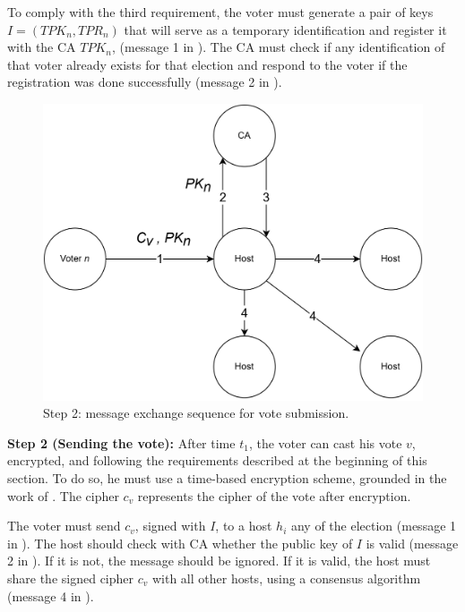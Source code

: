 \documentclass[english]{textolivre}
\begin{document}
To comply with the third requirement, the voter must generate a pair of keys $I = (TPK_{n}, TPR_{n})$ that will serve as a temporary identification and register it with the CA $TPK_{n}$, (message 1 in ). The CA must check if any identification of that voter already exists for that election and respond to the voter if the registration was done successfully (message 2 in ).

\begin{figure}[htb]
\centering
\begin{minipage}{.8\textwidth}
\includegraphics[width=\textwidth]{imagens/fig-003.png}
\caption{Step 2: message exchange sequence for vote submission.}\label{fase2etapa2}
\end{minipage}
\end{figure}


\textbf{Step 2 (Sending the vote):} After time $t_{1}$, the voter can cast his vote $v$, encrypted, and following the requirements described at the beginning of this section. To do so, he must use a time-based encryption scheme, grounded in the work of \textcite{Liu}. The cipher $c_{v}$ represents the cipher of the vote after encryption.

The voter must send $c_{v}$, signed with $I$, to a host $h_{i}$ any of the election (message 1 in ). The host should check with CA whether the public key of $I$ is valid (message 2 in ). If it is not, the message should be ignored. If it is valid, the host must share the signed cipher $c_{v}$ with all other hosts, using a consensus algorithm (message 4 in ).
\end{document}
